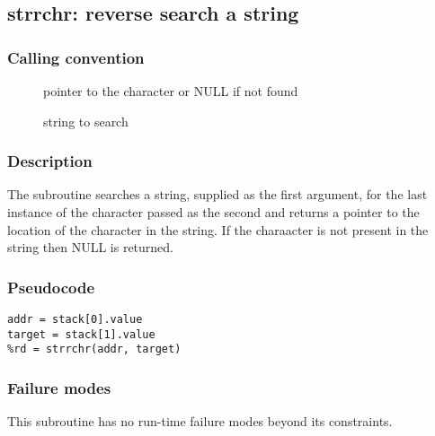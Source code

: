 \clearpage
{}
{}
\label{subr:strrchr}
\subsection*{strrchr: reverse search a string}

\subsubsection*{Calling convention}

\begin{description}
\item[] pointer to the character or NULL if not found
\item[] string to search
\end{description}

\subsubsection*{Description}

The  subroutine searches a string, supplied as the
first argument, for the last instance of the character passed as the
second and returns a pointer to the location of the character in the
string.  If the charaacter is not present in the string then NULL is
returned.

\subsubsection*{Pseudocode}

\begin{verbatim}
addr = stack[0].value
target = stack[1].value
%rd = strrchr(addr, target)
\end{verbatim}

\subsubsection*{Failure modes}

This subroutine has no run-time failure modes beyond its constraints.
